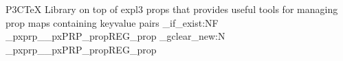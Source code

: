 {P3CTeX Library on top of expl3 props that provides useful tools for managing prop maps containing keyvalue pairs}
\prop_if_exist:NF \g_pxprp__pxPRP_propREG_prop
{
	\prop_gclear_new:N \g_pxprp__pxPRP_propREG_prop
}

